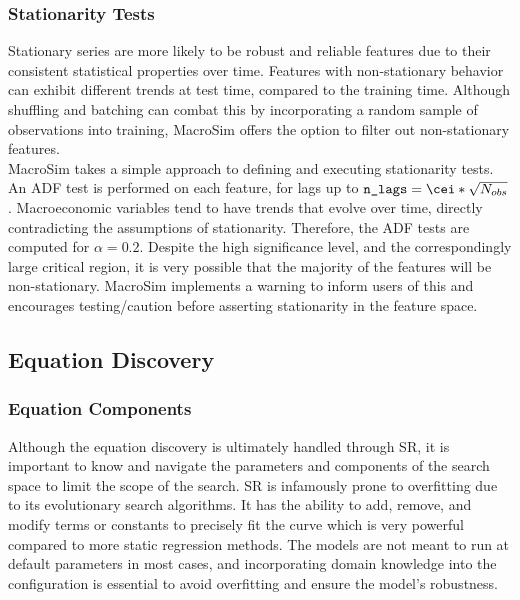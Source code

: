 \subsubsection{Stationarity Tests}\label{subsubsec:stationarity-tests}
    Stationary series are more likely to be robust and reliable features due to their consistent statistical properties over time.
    Features with non-stationary behavior can exhibit different trends at test time, compared to the training time.
    Although shuffling and batching can combat this by incorporating a random sample of observations into training, MacroSim offers the option to filter out non-stationary features.
    \\

    MacroSim takes a simple approach to defining and executing stationarity tests.
    An ADF test is performed on each feature, for lags up to $ \texttt{n\_lags} = \cei*{\sqrt{N_{obs}}} $.
    Macroeconomic variables tend to have trends that evolve over time, directly contradicting the assumptions of stationarity.
    Therefore, the ADF tests are computed for $\alpha = 0.2$.
    Despite the high significance level, and the correspondingly large critical region, it is very possible that the majority of the features will be non-stationary.
    MacroSim implements a warning to inform users of this and encourages testing/caution before asserting stationarity in the feature space.

\subsection{Equation Discovery}\label{subsec:equation-discovery}
\subsubsection{Equation Components}\label{subsubsec:equation-components}
    Although the equation discovery is ultimately handled through SR, it is important to know and navigate the parameters and components of the search space to limit the scope of the search.
    SR is infamously prone to overfitting due to its evolutionary search algorithms.
    It has the ability to add, remove, and modify terms or constants to precisely fit the curve which is very powerful compared to more static regression methods.
    The models are not meant to run at default parameters in most cases, and incorporating domain knowledge into the configuration is essential to avoid overfitting and ensure the model's robustness.
    \\

